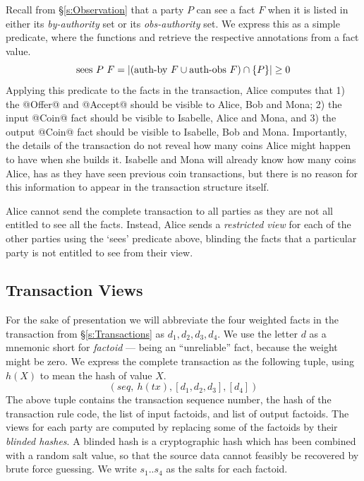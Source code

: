Recall from \S\ref{s:Observation} that a party $P$ can see a fact $F$ when it is listed in either its \emph{by-authority} set or its \emph{obs-authority} set. We express this as a simple predicate, where the functions  and  retrieve the respective annotations from a fact value.
$$
\textrm{sees}~ P~ F = |(\textrm{auth-by}~F \cup \textrm{auth-obs}~F) \cap \{P\}| \ge 0
$$
Applying this predicate to the facts in the transaction, Alice computes that 1) the @Offer@ and @Accept@ should be visible to Alice, Bob and Mona; 2) the input @Coin@ fact should be visible to Isabelle, Alice and Mona, and 3) the output @Coin@ fact should be visible to Isabelle, Bob and Mona. Importantly, the details of the transaction do not reveal how many coins Alice might happen to have when she builds it. Isabelle and Mona will already know how many coins Alice, has as they have seen previous coin transactions, but there is no reason for this information to appear in the transaction structure itself.

Alice cannot send the complete transaction to all parties as they are not all entitled to see all the facts. Instead, Alice sends a \emph{restricted view} for each of the other parties using the `sees' predicate above, blinding the facts that a particular party is not entitled to see from their view.


\subsection{Transaction Views}
For the sake of presentation we will abbreviate the four weighted facts in the transaction from \S\ref{s:Transactions} as $d_1, d_2, d_3, d_4$. We use the letter $d$ as a mnemonic short for \emph{factoid} --- being an ``unreliable'' fact, because the weight might be zero. We express the complete transaction as the following tuple, using $h(X)$ to mean the hash of value $X$.
$$
 (seq,~ h(tx), [d_1, d_2, d_3], [d_4])
$$
The above tuple contains the transaction sequence number, the hash of the transaction rule code, the list of input factoids, and list of output factoids. The views for each party are computed by replacing some of the factoids by their \emph{blinded hashes}. A blinded hash is a cryptographic hash which has been combined with a random salt value, so that the source data cannot feasibly be recovered by brute force guessing. We write $s_1 .. s_4$ as the salts for each factoid.

